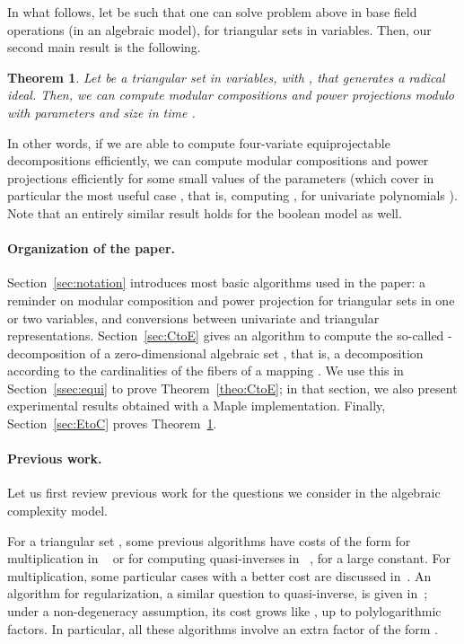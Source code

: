 \documentclass[12pt]{article}
\newtheorem{Theo}{Theorem}
\begin{document}
In what follows, let  be such that one can solve
problem  above in  base field operations
(in an algebraic model), for triangular sets in  variables. Then,
our second main result is the following.

\begin{Theo}
  \label{theo:EtoC}
  Let  be a triangular set in  variables, with ,
  that generates a radical ideal. Then, we can compute modular
  compositions and power projections modulo  with
  parameters  and size  in time
  .
\end{Theo}
\noindent In other words, if we are able to compute four-variate
equiprojectable decompositions efficiently, we can compute modular
compositions and power projections efficiently for some small values
of the parameters (which cover in particular the most useful case
, that is, computing , for univariate polynomials
). Note that an entirely similar result holds for the boolean
model as well.

\paragraph{Organization of the paper.} 
Section~\ref{sec:notation} introduces most basic algorithms used in
the paper: a reminder on modular composition and power projection for
triangular sets in one or two variables, and conversions between
univariate and triangular representations. Section~\ref{sec:CtoE}
gives an algorithm to compute the so-called -decomposition of a
zero-dimensional algebraic set , that is, a decomposition according
to the cardinalities of the fibers of a mapping . We use this in Section~\ref{ssec:equi} to prove
Theorem~\ref{theo:CtoE}; in that section, we also present experimental
results obtained with a Maple implementation. Finally,
Section~\ref{sec:EtoC} proves Theorem~\ref{theo:EtoC}.


\paragraph{Previous work.}
Let us first review previous work for the questions we consider in the
algebraic complexity model.

For a triangular set , some previous algorithms have costs of the
form  for multiplication in
~\cite{LiMoSc09} or  for computing
quasi-inverses in ~\cite{DaMoScXi06}, for  a large
constant. For multiplication, some particular cases with a better
cost are discussed in~\cite{BoChHoSc09}. An algorithm for
regularization, a similar question to quasi-inverse, is given
in~\cite{LiMoPa09,LiMoPa10}; under a non-degeneracy assumption, its
cost grows like , up
to polylogarithmic factors. In particular, all these algorithms
involve an extra factor of the form .
\end{document}
